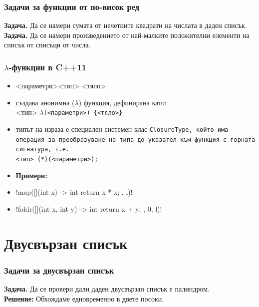 \documentclass[alsotrans]{beamerswitch}
\begin{document}
\begin{frame}
  \frametitle{Задачи за функции от по-висок ред}

  \textbf{Задача.} Да се намери сумата от нечетните квадрати на числата в даден списък.\\[6ex]
  \pause
  \textbf{Задача.} Да се намери произведението от най-малките положителни елементи на списък от списъци от числа.
\end{frame}

\begin{frame}[fragile]
  \frametitle{$\lambda$-функции в C++11}
  \begin{itemize}[<+->]
  \item \tta{[](}<параметри>\tta{) -> }<тип> \tta{\{}<тяло>\tta{\}}
  \item създава анонимна ($\lambda$) функция, дефинирана като:\\
    <тип> $\lambda$\tt(<параметри>\tt{) \{}<тяло>\tt\}
  \item типът на израза е специален системен клас \tt{ClosureType}, който има операция за преобразуване на типа до указател към функция с горната сигнатура, т.е.\\
    <тип> \tt{(*)(}<параметри>\tt{);}
  \item \textbf{Примери:}
  \item \lst!map([](int x) -> int { return x * x; }, l)!
  \item \lst!foldr([](int x, int y) -> int { return x + y; }, 0, l)!
  \end{itemize}
\end{frame}

\section{Двусвързан списък}


\begin{frame}
  \frametitle{Задачи за двусвързан списък}

  \textbf{Задача.} Да се провери дали даден двусвързан списък е палиндром.\\[2ex]
  \pause
  \textbf{Решение:} Обхождаме едновременно в двете посоки.
\end{frame}
\end{document}
